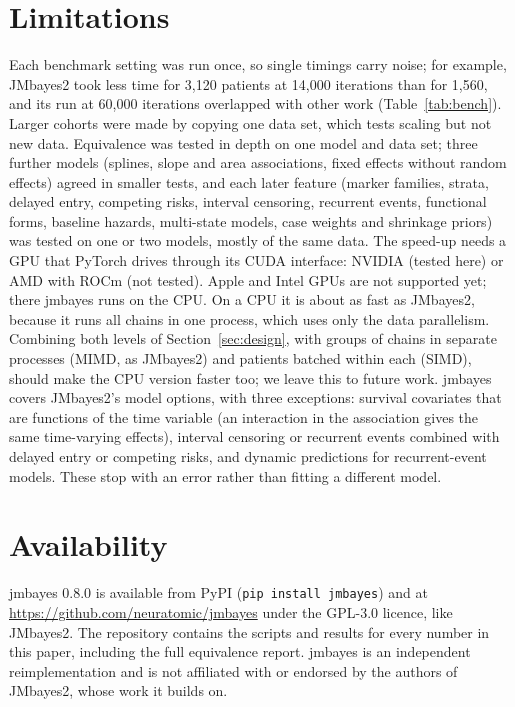 \documentclass[11pt]{article}
\begin{document}
\section{Limitations}

Each benchmark setting was run once, so single timings carry noise; for example, JMbayes2
took less time for 3,120 patients at 14,000 iterations than for 1,560, and its run at
60,000 iterations overlapped with other work (Table~\ref{tab:bench}). Larger cohorts were
made by copying one data set, which tests scaling but not new data. Equivalence was tested
in depth on one model and data set; three further models (splines, slope and area
associations, fixed effects without random effects) agreed in smaller tests, and
each later feature (marker families, strata, delayed entry, competing risks, interval
censoring, recurrent events, functional forms, baseline hazards, multi-state models, case
weights and shrinkage priors) was tested on one or two models, mostly of the same data.
The speed-up needs a GPU that PyTorch drives through its CUDA interface: NVIDIA
(tested here) or AMD with ROCm (not tested). Apple and Intel GPUs are not supported
yet; there jmbayes runs on the CPU. On a CPU it is about as fast as JMbayes2, because it
runs all chains in one process, which uses only the data parallelism. Combining both
levels of Section~\ref{sec:design}, with groups of chains in separate processes (MIMD, as
JMbayes2) and patients batched within each (SIMD), should make the CPU version faster too;
we leave this to future work. jmbayes covers JMbayes2's model options, with three
exceptions: survival covariates that are functions of the time variable (an interaction
in the association gives the same time-varying effects), interval censoring or recurrent
events combined with delayed entry or competing risks, and dynamic predictions for
recurrent-event models. These stop with an error rather than fitting a different model.

\section{Availability}

jmbayes 0.8.0 is available from PyPI (\texttt{pip install jmbayes}) and at
\url{https://github.com/neuratomic/jmbayes} under the GPL-3.0 licence, like JMbayes2. The
repository contains the scripts and results for every number in this paper, including the
full equivalence report. jmbayes is an independent reimplementation and is not affiliated
with or endorsed by the authors of JMbayes2, whose work it builds on.
\end{document}
